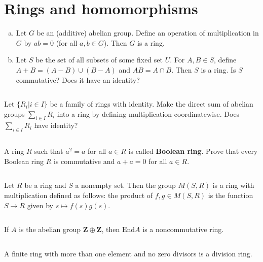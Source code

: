 \section{Rings and homomorphisms}
\begin{ex}
    \begin{enumerate}[(a)]
        \item Let $G$ be an (additive) abelian group. Define an operation of multiplication in $G$ by $ab=0$ (for all $a, b\in G$). Then $G$ is a ring.
        \item Let $S$ be the set of all subsets of some fixed set $U$. For $A, B\in S$, define $A+B=(A-B)\cup (B-A)$ and $AB=A\cap B$. Then $S$ is a ring. Is $S$ commutative? Does it have an identity?
    \end{enumerate}
\end{ex}

$$ $$

\begin{ex}
    Let $\{R_{i}|i\in I\}$ be a family of rings with identity. Make the direct sum of abelian groups $\sum\limits_{i\in I}R_{i}$ into a ring by defining multiplication coordinatewise. Does $\sum\limits_{i\in I}R_{i}$ have identity?
\end{ex}

$$ $$

\begin{ex}
    A ring $R$ such that $a^{2}=a$ for all $a\in R$ is called \textbf{Boolean ring}. Prove that every Boolean ring $R$ is commutative and $a+a=0$ for all $a\in R$.
\end{ex}

$$ $$

\begin{ex}
    Let $R$ be a ring and $S$ a nonempty set. Then the group $M(S,R)$ is a ring with multiplication defined as follows: the product of $f, g\in M(S,R)$ is the function $S\to R$ given by $s\mapsto f(s)g(s)$.
\end{ex}

$$ $$

\begin{ex}
    If $A$ is the abelian group $\mathbf{Z}\oplus \mathbf{Z}$, then $\mathrm{End} A$ is a noncommutative ring.
\end{ex}

$$ $$

\begin{ex}
    A finite ring with more than one element and no zero divisors is a division ring.
\end{ex}

